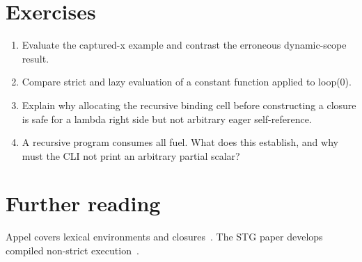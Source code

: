 \section{Exercises}
\label{sec:ch89-exercises}
\begin{enumerate}
\item\label{ex:ch89-scope} Evaluate the captured-x example and contrast the erroneous dynamic-scope result.
\item\label{ex:ch89-strict} Compare strict and lazy evaluation of a constant function applied to loop(0).
\item\label{ex:ch89-recursion} Explain why allocating the recursive binding cell before constructing a closure is safe for a lambda right side but not arbitrary eager self-reference.
\item\label{ex:ch89-budget} A recursive program consumes all fuel.
What does this establish, and why must the CLI not print an arbitrary partial scalar?
\end{enumerate}

\section{Further reading}
\label{sec:ch89-reading}
Appel covers lexical environments and closures~\cite{appel-1998-modern}.
The STG paper develops compiled non-strict execution~\cite{peytonjones-1992-stg}.
